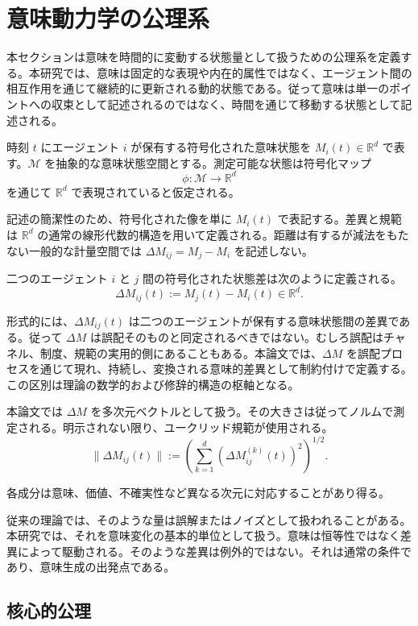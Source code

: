 \documentclass[11pt,a4paper]{article}
\theoremstyle{definition}
\begin{document}
\section{意味動力学の公理系}

本セクションは意味を時間的に変動する状態量として扱うための公理系を定義する。本研究では、意味は固定的な表現や内在的属性ではなく、エージェント間の相互作用を通じて継続的に更新される動的状態である。従って意味は単一のポイントへの収束として記述されるのではなく、時間を通じて移動する状態として記述される。

時刻 $t$ にエージェント $i$ が保有する符号化された意味状態を $M_i(t) \in \mathbb{R}^d$ で表す。$\mathcal{M}$ を抽象的な意味状態空間とする。測定可能な状態は符号化マップ
\[
\phi : \mathcal{M} \to \mathbb{R}^d
\]
を通じて $\mathbb{R}^d$ で表現されていると仮定される。

記述の簡潔性のため、符号化された像を単に $M_i(t)$ で表記する。差異と規範は $\mathbb{R}^d$ の通常の線形代数的構造を用いて定義される。距離は有するが減法をもたない一般的な計量空間では $\Delta M_{ij} = M_j - M_i$ を記述しない。

二つのエージェント $i$ と $j$ 間の符号化された状態差は次のように定義される。
\[
\Delta M_{ij}(t) := M_j(t) - M_i(t) \in \mathbb{R}^d.
\]

形式的には、$\Delta M_{ij}(t)$ は二つのエージェントが保有する意味状態間の差異である。従って $\Delta M$ は誤配そのものと同定されるべきではない。むしろ誤配はチャネル、制度、規範の実用的側にあることもある。本論文では、$\Delta M$ を誤配プロセスを通じて現れ、持続し、変換される意味的差異として制約付けで定義する。この区別は理論の数学的および修辞的構造の枢軸となる。

本論文では $\Delta M$ を多次元ベクトルとして扱う。その大きさは従ってノルムで測定される。明示されない限り、ユークリッド規範が使用される。
\[
\|\Delta M_{ij}(t)\| := \left(\sum_{k=1}^{d} (\Delta M^{(k)}_{ij}(t))^2\right)^{1/2}.
\]

各成分は意味、価値、不確実性など異なる次元に対応することがあり得る。

従来の理論では、そのような量は誤解またはノイズとして扱われることがある。本研究では、それを意味変化の基本的単位として扱う。意味は恒等性ではなく差異によって駆動される。そのような差異は例外的ではない。それは通常の条件であり、意味生成の出発点である。

\subsection{核心的公理}
\end{document}
